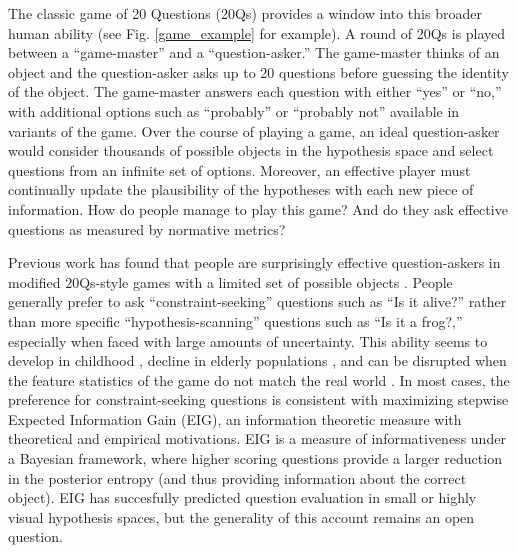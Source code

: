 \documentclass[11pt,letterpaper]{article}
\begin{document}
The classic game of 20 Questions (20Qs) provides a window into this broader human ability (see Fig. \ref{game_example} for example). A round of 20Qs is played between a ``game-master'' and a ``question-asker.''
The game-master thinks of an object and the question-asker asks up to 20 questions before guessing the identity of the object.
The game-master answers each question with either ``yes'' or ``no,'' with additional options such as ``probably'' or ``probably not'' available in variants of the game.
Over the course of playing a game, an ideal question-asker would consider thousands of possible objects in the hypothesis space and select questions from an infinite set of options.
Moreover, an effective player must continually update the plausibility of the hypotheses with each new piece of information.
How do people manage to play this game?
And do they ask effective questions as measured by normative metrics?

Previous work has found that people are surprisingly effective question-askers in modified 20Qs-style games with a limited set of possible objects \cite{Eimas1970, Denney1973, Program1982, Nelson2014, Ruggeri2015}.
People generally prefer to ask ``constraint-seeking'' questions such as ``Is it alive?'' rather than more specific ``hypothesis-scanning'' questions such as ``Is it a frog?,'' especially when faced with large amounts of uncertainty.
This ability seems to develop in childhood \cite{Eimas1970,Ruggeri2015}, decline in elderly populations \cite{Denney1973}, and can be disrupted when the feature statistics of the game do not match the real world \cite{Nelson2014}.
In most cases, the preference for constraint-seeking questions is consistent with maximizing stepwise Expected Information Gain (EIG), an information theoretic measure with theoretical and empirical motivations.
EIG is a measure of informativeness under a Bayesian framework, where higher scoring questions provide a larger reduction in the posterior entropy (and thus providing information about the correct object). 
EIG has succesfully predicted question evaluation in small \cite{Eimas1970,Nelson2014,Ruggeri2015} or highly visual \cite{Gureckis2009,Rothe2016} hypothesis spaces, but the generality of this account remains an open question.
\end{document}
